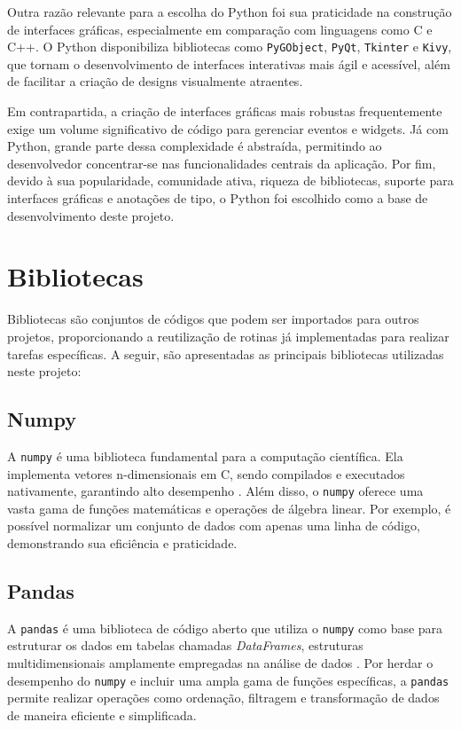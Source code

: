 Outra razão relevante para a escolha do Python foi sua praticidade na construção de interfaces gráficas, especialmente em comparação com linguagens como C e C++. O Python disponibiliza bibliotecas como \texttt{PyGObject}, \texttt{PyQt}, \texttt{Tkinter} e \texttt{Kivy}, que tornam o desenvolvimento de interfaces interativas mais ágil e acessível, além de facilitar a criação de designs visualmente atraentes.

Em contrapartida, a criação de interfaces gráficas mais robustas frequentemente exige um volume significativo de código para gerenciar eventos e widgets. Já com Python, grande parte dessa complexidade é abstraída, permitindo ao desenvolvedor concentrar-se nas funcionalidades centrais da aplicação. Por fim, devido à sua popularidade, comunidade ativa, riqueza de bibliotecas, suporte para interfaces gráficas e anotações de tipo, o Python foi escolhido como a base de desenvolvimento deste projeto.

\section{Bibliotecas}

Bibliotecas são conjuntos de códigos que podem ser importados para outros projetos, proporcionando a reutilização de rotinas já implementadas para realizar tarefas específicas. A seguir, são apresentadas as principais bibliotecas utilizadas neste projeto:

\subsection{Numpy}

A \texttt{numpy} é uma biblioteca fundamental para a computação científica. Ela implementa vetores n-dimensionais em C, sendo compilados e executados nativamente, garantindo alto desempenho \citep{numpy}. Além disso, o \texttt{numpy} oferece uma vasta gama de funções matemáticas e operações de álgebra linear. Por exemplo, é possível normalizar um conjunto de dados com apenas uma linha de código, demonstrando sua eficiência e praticidade.

\subsection{Pandas}

A \texttt{pandas} é uma biblioteca de código aberto que utiliza o \texttt{numpy} como base para estruturar os dados em tabelas chamadas \textit{DataFrames}, estruturas multidimensionais amplamente empregadas na análise de dados \citep{pandas}. Por herdar o desempenho do \texttt{numpy} e incluir uma ampla gama de funções específicas, a \texttt{pandas} permite realizar operações como ordenação, filtragem e transformação de dados de maneira eficiente e simplificada.

